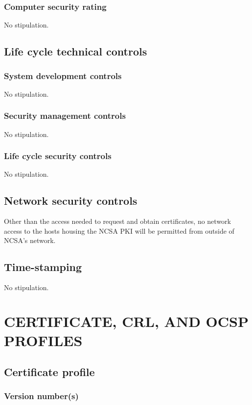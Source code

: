 \documentclass[10pt]{article}
\begin{document}
\subsubsection{Computer security rating}

No stipulation.

\subsection{Life cycle technical controls}
\subsubsection{System development controls}

No stipulation.

\subsubsection{Security management controls}

No stipulation.

\subsubsection{Life cycle security controls}

No stipulation.

\subsection{Network security controls}

Other than the access needed to request and obtain certificates, no
network access to the hosts housing the NCSA PKI will be permitted
from outside of NCSA's network.

\subsection{Time-stamping}

No stipulation.

\section{CERTIFICATE, CRL, AND OCSP PROFILES}
\subsection{Certificate profile}
\subsubsection{Version number(s)}
\end{document}
